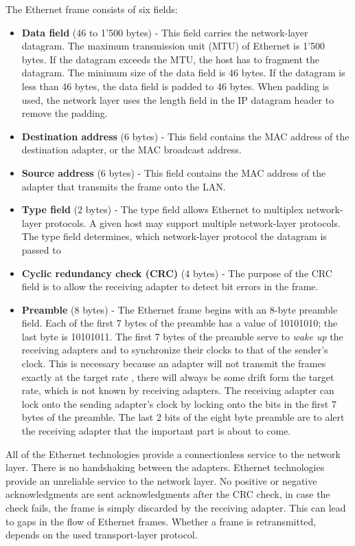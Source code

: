 The Ethernet frame consists of six fields:
\begin{itemize}
\item \textbf{Data field} (46 to 1'500 bytes) - This field carries the network-layer datagram. The maximum transmission unit (MTU) of Ethernet is 1'500 bytes. If the datagram exceeds the MTU, the host has to fragment the datagram. The minimum size of the data field is 46 bytes. If the datagram is less than 46 bytes, the data field is padded to 46 bytes. When padding is used, the network layer uses the length field in the IP datagram header to remove the padding.
\item \textbf{Destination address} (6 bytes) - This field contains the MAC address of the destination adapter, or the MAC broadcast address.
\item \textbf{Source address} (6 bytes) - This field contains the MAC address of the adapter that transmits the frame onto the LAN.
\item \textbf{Type field} (2 bytes) - The type field allows Ethernet to multiplex network-layer protocols. A given host may support multiple network-layer protocols. The type field determines, which network-layer protocol the datagram is passed to
\item \textbf{Cyclic redundancy check (CRC)} (4 bytes) - The purpose of the CRC field is to allow the receiving adapter to detect bit errors in the frame.
\item \textbf{Preamble} (8 bytes) - The Ethernet frame begins with an 8-byte preamble field. Each of the first 7 bytes of the preamble has a value of 10101010; the last byte is 10101011. The first 7 bytes of the preamble serve to \textit{wake up} the receiving adapters and to synchronize their clocks to that of the sender's clock. This is necessary because an adapter will not transmit the frames exactly at the target rate , there will always be some drift form the target rate, which is not known by receiving adapters. The receiving adapter can lock onto the sending adapter's clock by locking onto the bits in the first 7 bytes of the preamble. The last 2 bits of the eight byte preamble are to alert the receiving adapter that the important part is about to come.
\end{itemize}
All of the Ethernet technologies provide a connectionless service to the network layer. There is no handshaking between the adapters. Ethernet technologies provide an unreliable service to the network layer. No positive or negative acknowledgments are sent acknowledgments after the CRC check, in case the check fails, the frame is simply discarded by the receiving adapter. This can lead to gaps in the flow of Ethernet frames. Whether a frame is retransmitted, depends on the used transport-layer protocol.


